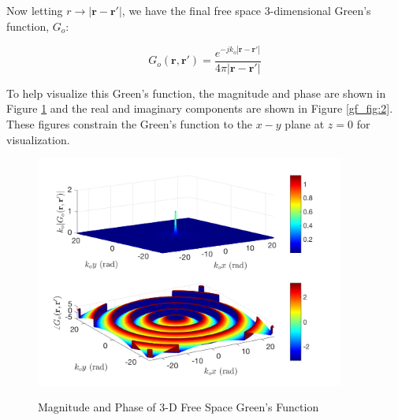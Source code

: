 \noindent Now letting $r \rightarrow |\mathbf{r}-\mathbf{r}'|$, we have the final free space 3-dimensional Green's function, $G_o$:

\begin{equation}
\boxed{G_o\left(\mathbf{r},\mathbf{r}'\right) = \frac{e^{-jk_o|\mathbf{r} - \mathbf{r}'|}}{4\pi |\mathbf{r} - \mathbf{r}'|}}
\label{gf_eq:26}
\end{equation}
\renewcommand{\baselinestretch}{2} \small\normalsize

To help visualize this Green's function, the magnitude and phase are shown in Figure \ref{gf_fig:1} and the real and imaginary components are shown in Figure \ref{gf_fig:2}. These figures constrain the Green's function to the $x-y$ plane at $z=0$ for visualization.

\begin{figure}[ht]
\begin{center}
\includegraphics[width=4in]{../media/3d_fs_gf_mag.png}
\end{center}
\renewcommand{\baselinestretch}{1}
\small\normalsize
\begin{quote}
\caption[Magnitude and Phase of 3-D Free Space Green's Function]{ Magnitude and Phase of 3-D Free Space Green's Function\label{gf_fig:1}}
\end{quote}
\end{figure} 
\renewcommand{\baselinestretch}{2}
\small\normalsize

